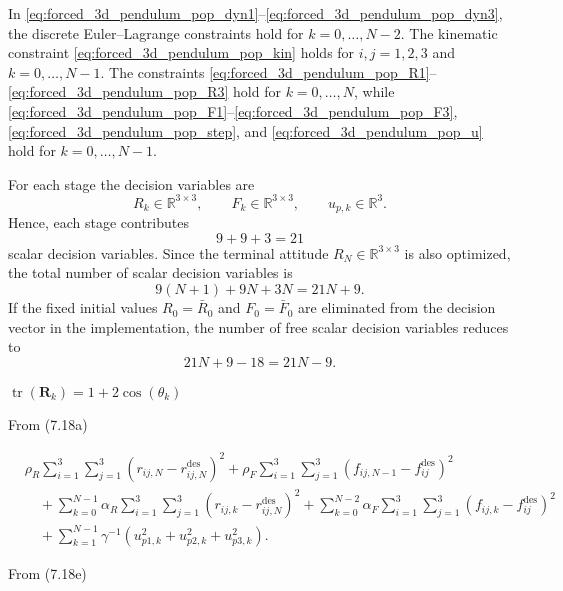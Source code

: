 In \eqref{eq:forced_3d_pendulum_pop_dyn1}--\eqref{eq:forced_3d_pendulum_pop_dyn3},
the discrete Euler--Lagrange constraints hold for $k=0,\dots,N-2$.
The kinematic constraint \eqref{eq:forced_3d_pendulum_pop_kin} holds for
$i,j=1,2,3$ and $k=0,\dots,N-1$.
The constraints \eqref{eq:forced_3d_pendulum_pop_R1}--\eqref{eq:forced_3d_pendulum_pop_R3}
hold for $k=0,\dots,N$, while
\eqref{eq:forced_3d_pendulum_pop_F1}--\eqref{eq:forced_3d_pendulum_pop_F3},
\eqref{eq:forced_3d_pendulum_pop_step}, and
\eqref{eq:forced_3d_pendulum_pop_u} hold for $k=0,\dots,N-1$.


For each stage the decision variables are
\[
R_k\in\mathbb{R}^{3\times 3},\qquad
F_k\in\mathbb{R}^{3\times 3},\qquad
u_{p,k}\in\mathbb{R}^3.
\]
Hence, each stage contributes
\[
9+9+3=21
\]
scalar decision variables. Since the terminal attitude $R_N\in\mathbb{R}^{3\times 3}$ is also optimized, the total number of scalar decision variables is
\[
9(N+1)+9N+3N = 21N+9.
\]
If the fixed initial values $R_0=\bar R_0$ and $F_0=\bar F_0$ are eliminated from the decision vector in the implementation, the number of free scalar decision variables reduces to
\[
21N+9-18 = 21N-9.
\]

$\operatorname{tr}(\bm{R}_k)= 1+2\cos(\theta_k)$ \cite{GallierQuaintance2025LinearAlgebra}

From (7.18a)

\begin{equation}
\begin{aligned}
&
\rho_R
\sum_{i=1}^{3}
\sum_{j=1}^{3}
\left(
r_{ij,N}
-
r_{ij,N}^{\mathrm{des}}
\right)^2
+
\rho_F
\sum_{i=1}^{3}
\sum_{j=1}^{3}
\left(
f_{ij,N-1}
-
f_{ij}^{\mathrm{des}}
\right)^2
\\
&\quad
+
\sum_{k=0}^{N-1}
\alpha_R
\sum_{i=1}^{3}
\sum_{j=1}^{3}
\left(
r_{ij,k}
-
r_{ij,N}^{\mathrm{des}}
\right)^2
+
\sum_{k=0}^{N-2}
\alpha_F
\sum_{i=1}^{3}
\sum_{j=1}^{3}
\left(
f_{ij,k}
-
f_{ij}^{\mathrm{des}}
\right)^2
\\
&\quad
+
\sum_{k=1}^{N-1}
\gamma^{-1}
\left(
u_{p1,k}^{2}
+
u_{p2,k}^{2}
+
u_{p3,k}^{2}
\right).
\end{aligned}
\label{eq:controlled_3d_pendulum_scalar_objective}
\end{equation}

From (7.18e)

